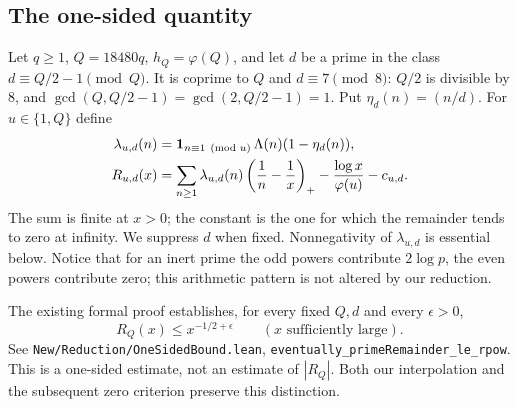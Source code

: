 \documentclass[11pt,a4paper]{article}
\theoremstyle{remark}\newtheorem{remark}[theorem]{Remark}
\newcommand{\ph}{\varphi}\newcommand{\ord}{\operatorname{ord}}\newcommand{\Rea}{\operatorname{Re}}
\begin{document}
\subsection{The one-sided quantity}
Let $q\ge1$, $Q=18480q$, $h_Q=\ph(Q)$, and let $d$ be a prime in the class $d\equiv Q/2-1\pmod Q$. It is coprime to $Q$ and $d\equiv7\pmod8$: $Q/2$ is divisible by $8$, and $\gcd(Q,Q/2-1)=\gcd(2,Q/2-1)=1$. Put $\eta_d(n)=(n/d)$. For $u\in\{1,Q\}$ define
\begin{align*}
\lambda_{u,d}(n)&=\mathbf1_{n\equiv1\pmod u}\,\Lambda(n)(1-\eta_d(n)),\\
R_{u,d}(x)&=\sum_{n\ge1}\lambda_{u,d}(n)\pos{\frac1n-\frac1x}
-\frac{\log x}{\ph(u)}-c_{u,d}.
\end{align*}
The sum is finite at $x>0$; the constant is the one for which the remainder tends to zero at infinity. We suppress $d$ when fixed. Nonnegativity of $\lambda_{u,d}$ is essential below. Notice that for an inert prime the odd powers contribute $2\log p$, the even powers contribute zero; this arithmetic pattern is not altered by our reduction.

The existing formal proof establishes, for every fixed $Q,d$ and every $\epsilon>0$,
\begin{equation}\label{eq:old}
R_Q(x)\le x^{-1/2+\epsilon}\qquad(x\text{ sufficiently large}).
\end{equation}
See \texttt{New/Reduction/OneSidedBound.lean}, \texttt{eventually\_primeRemainder\_le\_rpow}. This is a one-sided estimate, not an estimate of $|R_Q|$. Both our interpolation and the subsequent zero criterion preserve this distinction.
\end{document}
